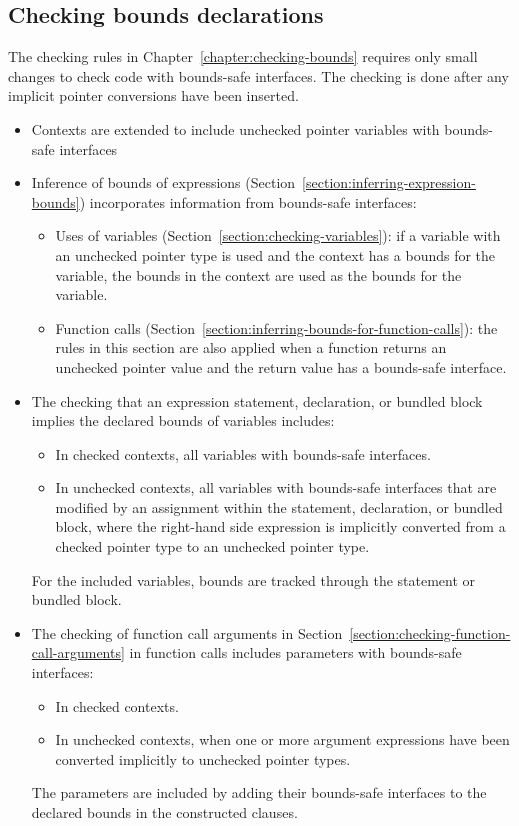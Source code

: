 \subsection{Checking bounds declarations}
\label{section:checking-bounds-interfaces}

The checking rules in Chapter~\ref{chapter:checking-bounds} requires
only small changes to check code with bounds-safe interfaces.  The
checking is done after any implicit pointer conversions have been
inserted.
\begin{itemize}
\item Contexts are extended to include unchecked pointer variables with
      bounds-safe interfaces
\item Inference of bounds of expressions (Section~\ref{section:inferring-expression-bounds}) incorporates information from bounds-safe interfaces:
\begin{itemize}
\item Uses of variables (Section~\ref{section:checking-variables}): 
      if a variable with an unchecked pointer type is used and the context has
      a bounds for the variable, the bounds in the context are used as the bounds
      for the variable.
\item Function calls (Section~\ref{section:inferring-bounds-for-function-calls}): 
      the rules in this section are also applied when a function returns an unchecked
      pointer value and the return value has a bounds-safe interface.
\end{itemize}
\item The checking that an expression statement, declaration, or bundled
      block implies the declared bounds of variables includes:
\begin{itemize}
\item In checked contexts, all variables with bounds-safe interfaces.
\item In unchecked contexts, all variables with bounds-safe interfaces
      that are modified by an assignment within the statement, declaration,
      or bundled block, where the right-hand side expression
      is implicitly converted from a checked pointer type to an unchecked pointer type.
\end{itemize}
For the included variables, bounds are tracked through the statement or
bundled block.
\item The checking of function call arguments in
      Section~\ref{section:checking-function-call-arguments} 
      in function calls includes parameters with bounds-safe interfaces: 
\begin{itemize}
\item In checked contexts.
\item In unchecked contexts, when one or more argument expressions have been 
      converted implicitly to unchecked pointer types.
\end{itemize}
The parameters are included by adding their bounds-safe interfaces to the
declared bounds in the constructed  clauses.
\end{itemize}

